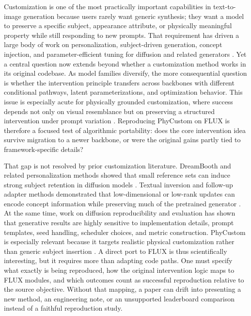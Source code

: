 \documentclass{article}
\begin{document}
Customization is one of the most practically important capabilities in text-to-image generation because users rarely want generic synthesis; they want a model to preserve a specific subject, appearance attribute, or physically meaningful property while still responding to new prompts. That requirement has driven a large body of work on personalization, subject-driven generation, concept injection, and parameter-efficient tuning for diffusion and related generators \cite{ruiz2023dreambooth,kumari2023multiconcept,hu2021lora}. Yet a central question now extends beyond whether a customization method works in its original codebase. As model families diversify, the more consequential question is whether the intervention principle transfers across backbones with different conditional pathways, latent parameterizations, and optimization behavior. This issue is especially acute for physically grounded customization, where success depends not only on visual resemblance but on preserving a structured intervention under prompt variation \cite{wu2025phycustom,blackforestlabs2024fluxdev}. Reproducing PhyCustom on FLUX is therefore a focused test of algorithmic portability: does the core intervention idea survive migration to a newer backbone, or were the original gains partly tied to framework-specific details?

That gap is not resolved by prior customization literature. DreamBooth and related personalization methods showed that small reference sets can induce strong subject retention in diffusion models \cite{ruiz2023dreambooth,kumari2023multiconcept}. Textual inversion and follow-up adapter methods demonstrated that low-dimensional or low-rank updates can encode concept information while preserving much of the pretrained generator \cite{hu2021lora}. At the same time, work on diffusion reproducibility and evaluation has shown that generative results are highly sensitive to implementation details, prompt templates, seed handling, scheduler choices, and metric construction. PhyCustom is especially relevant because it targets realistic physical customization rather than generic subject insertion \cite{wu2025phycustom}. A direct port to FLUX is thus scientifically interesting, but it requires more than adapting code paths. One must specify what exactly is being reproduced, how the original intervention logic maps to FLUX modules, and which outcomes count as successful reproduction relative to the source objective. Without that mapping, a paper can drift into presenting a new method, an engineering note, or an unsupported leaderboard comparison instead of a faithful reproduction study.
\end{document}
